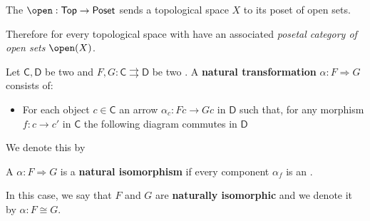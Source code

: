 \documentclass[../main.tex]{subfiles}
\begin{document}
\begin{example} \label{ex:open-set-category}
  The  \(\open: \Top \to \mathsf{Poset}\) sends a topological space \(X\) to its poset of open sets.

  Therefore for every topological space with have an associated \textit{posetal category of open sets} \(\open(X)\).
\end{example}


\begin{definition} \label{def:natural-transformation}
  Let \(\mathsf{C}, \mathsf{D}\) be two  and \(F, G: \mathsf{C} \rightrightarrows \mathsf{D}\) be two .
  A \textbf{natural transformation} \(\alpha: F \Rightarrow G\) consists of:
  \begin{itemize}
    \item For each object \(c \in \mathsf{C}\) an arrow \(\alpha_{c}: Fc \to Gc\) in \(\mathsf{D}\) such that, for any morphism \(f: c \to c'\) in \(\mathsf{C}\) the following diagram commutes in \(\mathsf{D}\)
          \begin{center}
          \end{center}
  \end{itemize}

  We denote this by
  \begin{center}
  \end{center}
\end{definition}

\begin{definition} \label{def:natural-isomorphism}
  A  \(\alpha: F \Rightarrow G\) is a \textbf{natural isomorphism} if every component \(\alpha_{f}\) is an .

  In this case, we say that \(F\) and \(G\) are \textbf{naturally isomorphic} and we denote it by \(\alpha: F \cong G\).
\end{definition}
\end{document}
